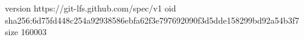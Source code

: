 version https://git-lfs.github.com/spec/v1
oid sha256:6d75fd448c254a92938586ebfa62f3e797692090f3d5dde158299bd92a54b3f7
size 160003
